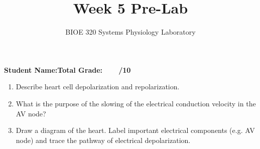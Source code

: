 \documentclass{article}
\title{Week 5 Pre-Lab}
\author{BIOE 320 Systems Physiology Laboratory}
\date{}
\begin{document}
\maketitle
\large

\textbf{Student Name:}\hfill 	\textbf{Total Grade:\ \ \ \ /10}\vspace{0.5cm}

\begin{enumerate}
	\item Describe heart cell depolarization and repolarization.
	\item What is the purpose of the slowing of the electrical conduction velocity in the AV node?
	\item Draw a diagram of the heart. Label important electrical components (e.g. AV node) and trace the pathway of electrical depolarization.
\end{enumerate}
\end{document}
